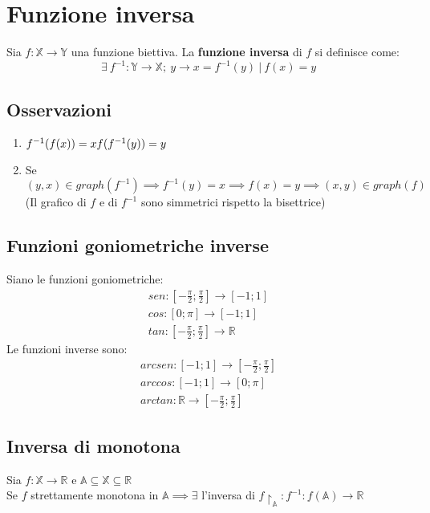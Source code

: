 \section{Funzione inversa}
Sia $f: \mathbb{X} \rightarrow \mathbb{Y}$ una funzione biettiva. La \textbf{funzione inversa} di $f$ si definisce come:
\begin{equation}
\exists\ f^{-1}: \mathbb{Y} \rightarrow \mathbb{X};\ y \rightarrow x = f^{-1}(y)\ |\ f(x) = y
\end{equation}
\subsection{Osservazioni}
\begin{enumerate}
\item $f^{-1}(f(x))=x\\
f(f^{-1}(y))=y$
\item Se $(y,x) \in graph(f^{-1}) \implies f^{-1}(y) = x \implies f(x)=y \implies (x,y) \in graph(f)$\\
(Il grafico di $f$ e di $f^{-1}$ sono simmetrici rispetto la bisettrice)
\end{enumerate}
\subsection{Funzioni goniometriche inverse}
Siano le funzioni goniometriche:
\begin{equation}
\begin{gathered}
sen: [-\frac{\pi}{2};\frac{\pi}{2}] \rightarrow [-1;1]\\
cos: [0;\pi] \rightarrow [-1;1]\\
tan: [-\frac{\pi}{2};\frac{\pi}{2}] \rightarrow \mathbb{R}
\end{gathered}
\end{equation}
Le funzioni inverse sono:
\begin{equation}
\begin{gathered}
arcsen: [-1;1] \rightarrow [-\frac{\pi}{2};\frac{\pi}{2}]\\
arccos: [-1;1] \rightarrow [0;\pi]\\
arctan: \mathbb{R} \rightarrow [-\frac{\pi}{2};\frac{\pi}{2}]
\end{gathered}
\end{equation}

\subsection{Inversa di monotona}
Sia $f: \mathbb{X} \rightarrow \mathbb{R}$ e $\mathbb{A} \subseteq \mathbb{X} \subseteq \mathbb{R}$\\
Se $f$ strettamente monotona in $\mathbb{A} \implies \exists $
 l'inversa di $f\restriction _\mathbb{A}: f^{-1}: f(\mathbb{A}) \rightarrow \mathbb{R}$